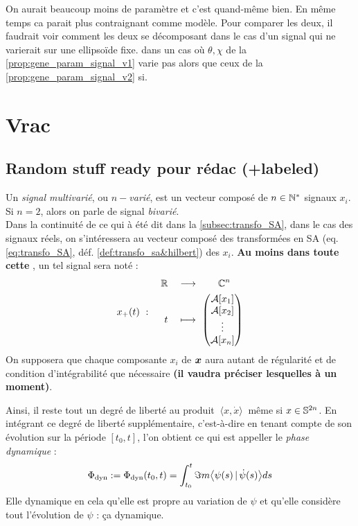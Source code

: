 On aurait beaucoup moins de paramètre et c'est quand-même bien. En même temps ca parait plus contraignant comme modèle. Pour comparer les deux, il faudrait voir comment les deux se décomposant dans le cas d'un signal qui ne varierait sur une ellipsoïde fixe. \ie dans un cas où $\theta,\chi$ de la \cref{prop:gene_param_signal_v1} varie pas alors que ceux de la \cref{prop:gene_param_signal_v2} si.



\section{Vrac}

\subsection{Random  stuff ready pour rédac (+labeled)}

\begin{definition}\label{def:signal_multivar}
	Un \emph{signal multivarié}, ou \emph{$n-$varié}, est un vecteur composé de $n\in\N^*$ signaux $x_i$. Si $n=2$, alors on parle de signal \emph{bivarié}.
	\\
	Dans la continuité de ce qui à été dit dans la \cref{subsec:transfo_SA}, dans le cas des signaux réels, on s'intéressera au vecteur composé des transformées en SA (eq. \ref{eq:transfo_SA}, déf. \ref{def:transfo_sa&hilbert}) des $x_i$.
	\textbf{Au moins dans toute cette }, un tel signal sera noté :
	\[\sa{x}(t)\ :\quad \begin{aligned} 
		\R\quad &\lr\qquad \C^n \\t\quad &\longmapsto\ \begin{pmatrix} \mathcal{A}[x_1] \\ 
			\mathcal{A}[x_2] \\ \vdots \\ \mathcal{A}[x_n] \end{pmatrix}
	\end{aligned} \]
	On supposera que chaque composante $x_i$ de $\bf{x}$ aura autant de régularité et de condition d'intégrabilité que nécessaire \textbf{(il vaudra préciser lesquelles à un moment)}.
\end{definition}

\begin{definition}\label{def:phase_dyn}
	Ainsi, il reste tout un degré de liberté au produit $\ \langle x, \dot{x} \rangle\ $ même si $x\in\S{2n}$. En intégrant ce degré de liberté supplémentaire, c'est-à-dire en tenant compte de son évolution sur la période $[t_0,t]$, l'on obtient ce qui est appeller le \emph{phase dynamique} :
	\[\phased \defeq \phased(t_0,t) = \int_{t_0}^t \Im m \big\langle \psi(s) \, |\, \dot{\psi}(s) \big\rangle ds\]
	Elle dynamique en cela qu'elle est propre au variation de $\psi$ et qu'elle considère tout l'évolution de $\psi$ : ça dynamique.
\end{definition}



